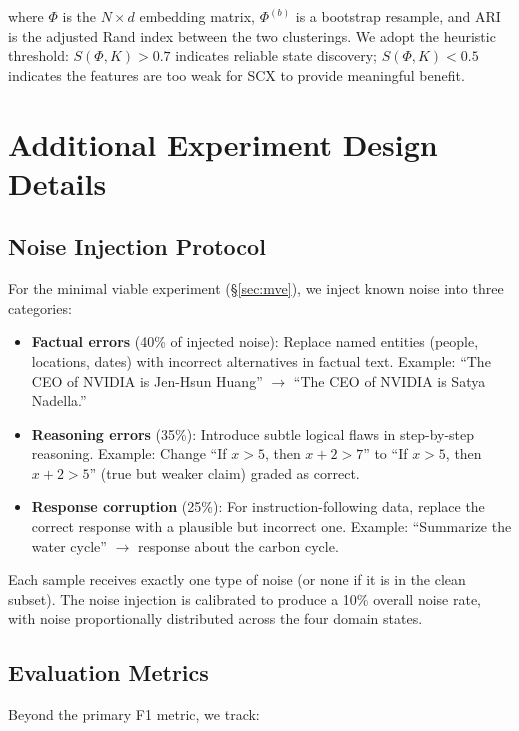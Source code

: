 \documentclass[11pt]{article}
\begin{document}
\noindent where $\Phi$ is the $N \times d$ embedding matrix, $\Phi^{(b)}$ is a bootstrap resample, and ARI is the adjusted Rand index between the two clusterings. We adopt the heuristic threshold: $S(\Phi, K) > 0.7$ indicates reliable state discovery; $S(\Phi, K) < 0.5$ indicates the features are too weak for SCX to provide meaningful benefit.

\section{Additional Experiment Design Details}

\subsection{Noise Injection Protocol}

For the minimal viable experiment (\S\ref{sec:mve}), we inject known noise into three categories:

\begin{itemize}
    \item \textbf{Factual errors} (40\% of injected noise): Replace named entities (people, locations, dates) with incorrect alternatives in factual text. Example: ``The CEO of NVIDIA is Jen-Hsun Huang'' $\to$ ``The CEO of NVIDIA is Satya Nadella.''
    \item \textbf{Reasoning errors} (35\%): Introduce subtle logical flaws in step-by-step reasoning. Example: Change ``If $x > 5$, then $x + 2 > 7$'' to ``If $x > 5$, then $x + 2 > 5$'' (true but weaker claim) graded as correct.
    \item \textbf{Response corruption} (25\%): For instruction-following data, replace the correct response with a plausible but incorrect one. Example: ``Summarize the water cycle'' $\to$ response about the carbon cycle.
\end{itemize}

Each sample receives exactly one type of noise (or none if it is in the clean subset). The noise injection is calibrated to produce a 10\% overall noise rate, with noise proportionally distributed across the four domain states.

\subsection{Evaluation Metrics}

Beyond the primary F1 metric, we track:
\end{document}
